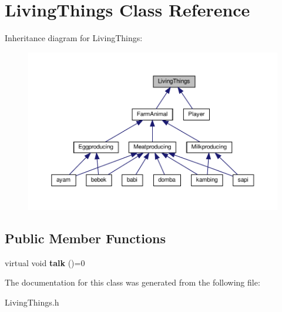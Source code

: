 \hypertarget{classLivingThings}{}\section{Living\+Things Class Reference}
\label{classLivingThings}


Inheritance diagram for Living\+Things\+:
\nopagebreak
\begin{figure}[H]
\begin{center}
\leavevmode
\includegraphics[width=350pt]{classLivingThings__inherit__graph}
\end{center}
\end{figure}
\subsection*{Public Member Functions}
\begin{DoxyCompactItemize}
\item 
\mbox{\label{classLivingThings_a2277af0cf3a294a7e17f2a6e01ba0d84}} 
virtual void {\bfseries talk} ()=0
\end{DoxyCompactItemize}


The documentation for this class was generated from the following file\+:\begin{DoxyCompactItemize}
\item 
Living\+Things.\+h\end{DoxyCompactItemize}
